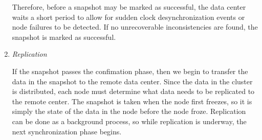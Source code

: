 \begin{enumerate}
  Therefore, before a snapshot may be marked as successful, the data center 
  waits a short period to allow for sudden clock desynchronization
  events or node failures to be detected. If no unrecoverable inconsistencies 
  are found, the snapshot is marked as successful.

\item \emph{Replication}
  
  If the snapshot passes the confimation phase, then we begin to transfer the 
  data in the snapshot to the remote data center. Since the data in the 
  cluster is distributed, each node must determine what data needs to be 
  replicated to the remote center. The snapshot is taken when the node first 
  freezes, so it is simply the state of the data in the node before the node 
  froze. Replication can be done as a 
  background process, so while replication is underway, the next 
  synchronization phase begins.

\end{enumerate}
